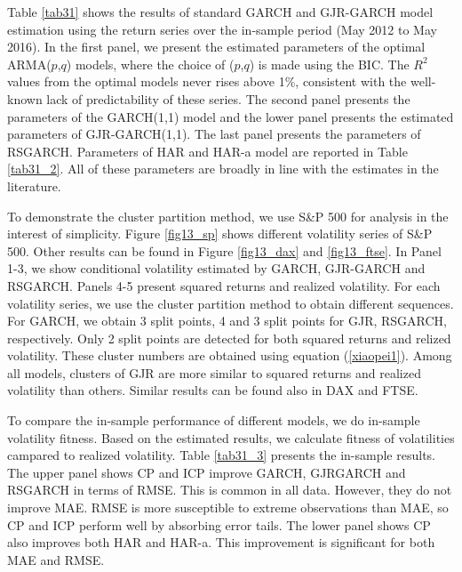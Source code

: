 \documentclass[preprint,12pt,authoryear]{elsarticle}
\begin{document}
Table \ref{tab31} shows the results of standard GARCH and GJR-GARCH model estimation using the return series over the in-sample period (May 2012 to May 2016). In the first panel, we present the estimated parameters of the optimal ARMA($p$,$q$) models, where the choice of ($p$,$q$) is made using the BIC. The $R^2$ values from the optimal models never rises above 1\%, consistent with the well-known lack of predictability of these series. The second panel presents the parameters of the GARCH(1,1) model and the lower panel presents the estimated parameters of GJR-GARCH(1,1). The last panel presents the parameters of RSGARCH.
Parameters of HAR and HAR-a model are reported in Table \ref{tab31_2}.
All of these parameters are broadly in line with the estimates in the literature.

To demonstrate the cluster partition method, we use S\&P 500 for analysis in the interest of simplicity.
Figure \ref{fig13_sp} shows different volatility series of S\&P 500. Other results can be found in Figure \ref{fig13_dax} and \ref{fig13_ftse}.
In Panel 1-3, we show conditional volatility estimated by GARCH, GJR-GARCH and RSGARCH. Panels 4-5 present squared returns and realized volatility. For each volatility series, we use the cluster partition method to obtain different sequences. For GARCH, we obtain 3 split points, 4 and 3 split points for GJR, RSGARCH, respectively. Only 2 split points are detected for both squared returns and relized volatility.
These cluster numbers are obtained using equation (\ref{xiaopei1}).
Among all models, clusters of GJR are more similar to squared returns and realized volatility than others.
Similar results can be found also in DAX and FTSE.

To compare the in-sample performance of different models, we do in-sample volatility fitness.
Based on the estimated results, we calculate fitness of volatilities campared to realized volatility.
Table \ref{tab31_3} presents the in-sample results. The upper panel shows CP and ICP improve GARCH, GJRGARCH and RSGARCH in terms of RMSE. This is common in all data. However, they do not improve MAE. RMSE is more susceptible to extreme observations than MAE, so CP and ICP perform well by absorbing error tails. The lower panel shows CP also improves both HAR and HAR-a. This improvement is significant for both MAE and RMSE.
\end{document}
